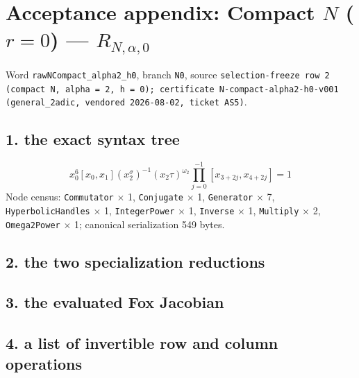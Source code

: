 %

\section{Acceptance appendix: Compact $N$ ($r = 0$) --- $R_{N,\alpha,0}$}
\label{sec:appendix-N0}

Word \texttt{rawNCompact\_alpha2\_h0}, branch \texttt{N0}, source \texttt{selection-freeze row 2 (compact N, alpha = 2, h = 0); certificate N-compact-alpha2-h0-v001 (general\_2adic, vendored 2026-08-02, ticket AS5)}.

\subsection{1. the exact syntax tree}
\[ x_0^6[x_0,x_1](x_2^\sigma)^{-1}(x_2\tau)^{\omega_2}\prod_{j=0}^{-1}[x_{3+2j},x_{4+2j}] = 1 \]
Node census: \texttt{Commutator} $\times$ 1, \texttt{Conjugate} $\times$ 1, \texttt{Generator} $\times$ 7, \texttt{HyperbolicHandles} $\times$ 1, \texttt{IntegerPower} $\times$ 1, \texttt{Inverse} $\times$ 1, \texttt{Multiply} $\times$ 2, \texttt{Omega2Power} $\times$ 1; canonical serialization 549 bytes.

\subsection{2. the two specialization reductions}

\subsection{3. the evaluated Fox Jacobian}

\subsection{4. a list of invertible row and column operations}


